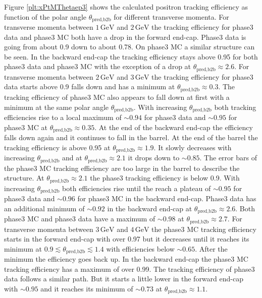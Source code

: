 \documentclass[a4paper,11pt,twosided,final,german,openbib,pdftex,listof=totoc,bibliography=totoc]{scrbook}
\begin{document}
Figure \ref{plt:xPtMThetaep3} shows the calculated positron tracking efficiency as function of the polar angle $\theta_{\textrm{pred,b2b}}$ for different transverse momenta.
For transverse momenta between $1\,\textrm{GeV}$ and $2\,\textrm{GeV}$ the tracking efficiency for phase3 data and phase3 MC both have a drop in the forward end-cap. Phase3 data is going from about 0.9 down to about 0.78. On phase3 MC a similar structure can be seen. In the backward end-cap the tracking efficiency stays above 0.95 for both phase3 data and phase3 MC with the exception of a drop at $\theta_{\textrm{pred,b2b}} \approx 2.6$.
For transverse momenta between $2\,\textrm{GeV}$ and $3\,\textrm{GeV}$ the tracking efficiency for phase3 data starts above 0.9 falls down and has a minimum at $\theta_{\textrm{pred,b2b}} \approx 0.3$. The tracking efficiency of phase3 MC also appears to fall down at first with a minimum at the same polar angle $\theta_{\textrm{pred,b2b}}$. With increasing $\theta_{\textrm{pred,b2b}}$ both tracking efficiencies rise to a local maximum of $\sim 0.94$ for phase3 data and $\sim 0.95$ for phase3 MC at $\theta_{\textrm{pred,b2b}} \approx 0.35$. At the end of the backward end-cap the efficiency falls down again and it continues to fall in the barrel. At the end of the barrel the tracking efficiency is above 0.95 at $\theta_{\textrm{pred,b2b}} \approx 1.9$. It slowly decreases with increasing $\theta_{\textrm{pred,b2b}}$ and at $\theta_{\textrm{pred,b2b}} \approx 2.1$ it drops down to $\sim 0.85$. The error bars of the phase3 MC tracking efficiency are too large in the barrel to describe the structure. At $\theta_{\textrm{pred,b2b}} \approx 2.1$ the phase3 tracking efficiency is below 0.9. With increasing $\theta_{\textrm{pred,b2b}}$ both efficiencies rise until the reach a plateau of $\sim 0.95$ for phase3 data and $\sim 0.96$ for phase3 MC in the backward end-cap. Phase3 data has an additional minimum of $\sim 0.92$ in the backward end-cap at $\theta_{\textrm{pred,b2b}} \approx 2.6$. Both phase3 MC and phase3 data have a maximum of $\sim 0.98$ at $\theta_{\textrm{pred,b2b}} \approx 2.7$.
For transverse momenta between $3\,\textrm{GeV}$ and $4\,\textrm{GeV}$ the phase3 MC tracking efficiency starts in the forward end-cap with over 0.97 but it decreases until it reaches its minimum at $0.9 \lesssim \theta_{\textrm{pred,b2b}} \lesssim 1.4$ with efficiencies below $\sim 0.65$. After the minimum the efficiency goes back up. In the backward end-cap the phase3 MC tracking efficiency has a maximum of over 0.99. The tracking efficiency of phase3 data follows a similar path. But it starts a little lower in the forward end-cap with $\sim 0.95$ and it reaches its minimum of $\sim 0.73$ at $\theta_{\textrm{pred,b2b}} \approx 1.1$.
\end{document}
